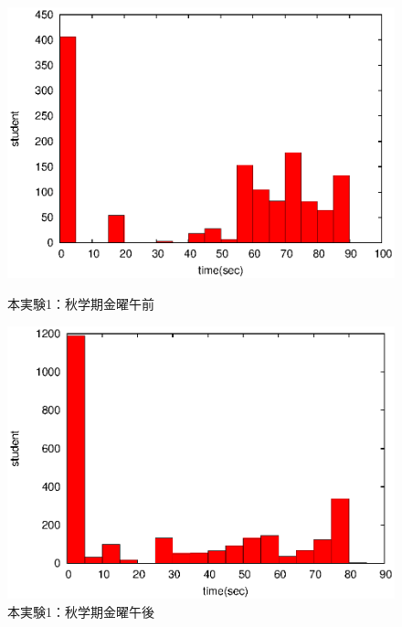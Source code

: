 \documentclass[a4paper,10pt]{jarticle}
\begin{document}
\begin{figure}[htpb]                        
\begin{minipage} {0.5\hsize}                             
\begin{center}                              
\includegraphics[bb=0 0 390 248,clip,width=\hsize]{xFr12_hist.eps}   
\caption{本実験1：秋学期金曜午前}                              
\label{xFr12}                                
\end{center}                                    
\end{minipage}                                 
\begin{minipage}{0.5\hsize}                                            
\begin{center}                              
\includegraphics[bb=0 0 390 248,clip,width=\hsize]{xFr345_hist.eps}   
\caption{本実験1：秋学期金曜午後}                              
\label{xFr345}                                
\end{center}                                    
\end{minipage}                                 
\end{figure}                                 
\end{document}
